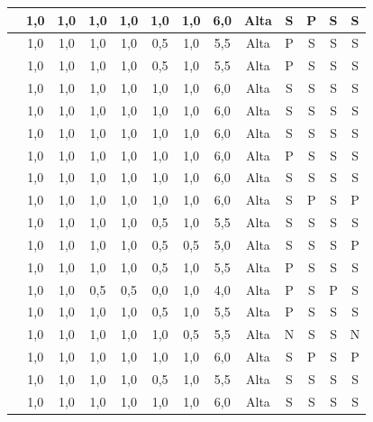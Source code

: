 \begin{scriptsize}
\begin{longtable}{|p{3cm}|c|c|c|c|c|c|c|c|c|c|c|c|}
\cite{sharit2008information}      & 1,0 & 1,0 & 1,0 & 1,0 & 1,0 & 1,0 & 6,0 & Alta & S & P & S & S \\ \hline
\cite{social_media_elderly}       & 1,0 & 1,0 & 1,0 & 1,0 & 0,5 & 1,0 & 5,5 & Alta & P & S & S & S \\ \hline
\cite{esticky2023}                & 1,0 & 1,0 & 1,0 & 1,0 & 0,5 & 1,0 & 5,5 & Alta & P & S & S & S \\ \hline
\cite{weighted_heuristic}         & 1,0 & 1,0 & 1,0 & 1,0 & 1,0 & 1,0 & 6,0 & Alta & S & S & S & S \\ \hline
\cite{health_problem_solving}     & 1,0 & 1,0 & 1,0 & 1,0 & 1,0 & 1,0 & 6,0 & Alta & S & S & S & S \\ \hline
\cite{secure_messaging}           & 1,0 & 1,0 & 1,0 & 1,0 & 1,0 & 1,0 & 6,0 & Alta & S & S & S & S \\ \hline
\cite{breaking_barriers}          & 1,0 & 1,0 & 1,0 & 1,0 & 1,0 & 1,0 & 6,0 & Alta & P & S & S & S \\ \hline
\cite{cowan2011exploring}         & 1,0 & 1,0 & 1,0 & 1,0 & 1,0 & 1,0 & 6,0 & Alta & S & S & S & S \\ \hline
\cite{skov2009conceptual}         & 1,0 & 1,0 & 1,0 & 1,0 & 1,0 & 1,0 & 6,0 & Alta & S & P & S & P \\ \hline
\cite{kouroupetroglou2016methodological} & 1,0 & 1,0 & 1,0 & 1,0 & 0,5 & 1,0 & 5,5 & Alta & S & S & S & S \\ \hline
\cite{goonetilleke2001effects}    & 1,0 & 1,0 & 1,0 & 1,0 & 0,5 & 0,5 & 5,0 & Alta & S & S & S & P \\ \hline
\cite{sustar2008requirements}     & 1,0 & 1,0 & 1,0 & 1,0 & 0,5 & 1,0 & 5,5 & Alta & P & S & S & S \\ \hline
\cite{park2015personalized}       & 1,0 & 1,0 & 0,5 & 0,5 & 0,0 & 1,0 & 4,0 & Alta & P & S & P & S \\ \hline
\cite{kabassi2004personalised}    & 1,0 & 1,0 & 1,0 & 1,0 & 0,5 & 1,0 & 5,5 & Alta & P & S & S & S \\ \hline
\cite{chevalier2003web}           & 1,0 & 1,0 & 1,0 & 1,0 & 1,0 & 0,5 & 5,5 & Alta & N & S & S & N \\ \hline
\cite{hornbaek2004usability}      & 1,0 & 1,0 & 1,0 & 1,0 & 1,0 & 1,0 & 6,0 & Alta & S & P & S & P \\ \hline
\cite{ro2024usability}            & 1,0 & 1,0 & 1,0 & 1,0 & 0,5 & 1,0 & 5,5 & Alta & S & S & S & S \\ \hline
\cite{trilar2021family}           & 1,0 & 1,0 & 1,0 & 1,0 & 1,0 & 1,0 & 6,0 & Alta & S & S & S & S \\ \hline

\end{longtable}
\end{scriptsize}
